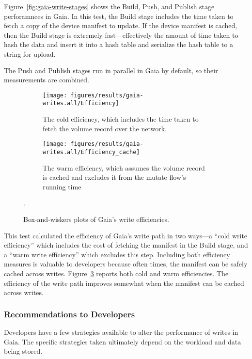 Figure~\ref{fig:gaia-write-stages} shows the Build, Push, and Publish stage
perforamnces in Gaia.  In this test, the Build stage includes
the time taken to fetch a copy of the device manifest to update.  If the device
manifest is cached, then the Build stage is extremely fast---effectively the amount of
time taken to hash the data and insert it into a hash table and serialize the
hash table to a string for upload.

The Push and Publish stages run in parallel in Gaia by default, so their
measurements are combined.

\begin{figure}[htp!]
   \centering
   \begin{subfigure}[b]{.8\textwidth}
      \texttt{[image: figures/results/gaia-writes.all/Efficiency]}
      \label{fig:gaia-read-getmanifest}
      \caption{The cold efficiency, which includes the time taken to fetch the
      volume record over the network.}
   \end{subfigure}
   \begin{subfigure}[b]{.8\textwidth}
      \texttt{[image: figures/results/gaia-writes.all/Efficiency\_cache]}
      \label{fig:gaia-read-discover}
      \caption{The warm efficiency, which assumes the volume record is cached
      and excludes it from the mutate flow's running time}
   \end{subfigure}
   \caption{Box-and-wiskers plots of Gaia's write efficiencies.}
   \label{fig:gaia-write-efficiencies}.
\end{figure}

This test calculated the efficiency of Gaia's write path in two ways---a ``cold
write efficiency'' which includes the cost of fetching the manifest in the Build
stage, and a ``warm write efficiency'' which excludes this step.  Including both
efficiency measures is valuable to developers because often times, the manifest
can be safely cached across writes.  Figure~\ref{fig:gaia-write-efficiencies}
reports both cold and warm efficiencies.  The efficiency of the write path
improves somewhat when the manifest can be cached across writes.

\subsubsection{Recommendations to Developers}

Developers have a few strategies available to alter the performance of writes in Gaia.
The specific strategies taken ultimately depend on the workload and data being
stored.


